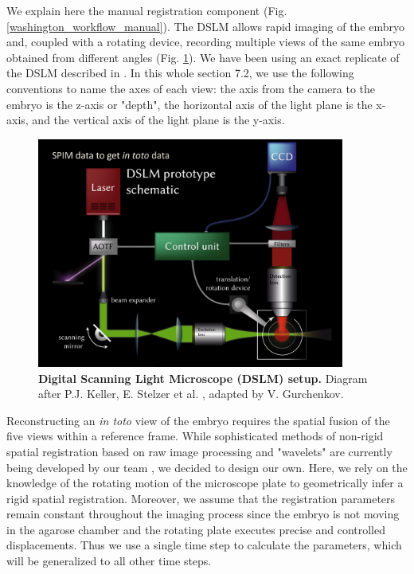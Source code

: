    We explain here the manual registration component (Fig. \ref{washington_workflow_manual}). The DSLM allows rapid imaging of the embryo and, coupled with a rotating device, recording multiple views of the same embryo obtained from different angles (Fig. \ref{washington_SPIM}). We have been using an exact replicate of the DSLM described in \cite{Keller:2008km}. In this whole section 7.2, we use the following conventions to name the axes of each view: the axis from the camera to the embryo is the z-axis or "depth", the horizontal axis of the light plane is the x-axis, and the vertical axis of the light plane is the y-axis.  
\begin{figure}
\begin{center}
\includegraphics[width=0.9\textwidth]{../../images/Reconstruction/washington/SPIM_corrected.png}
\end{center}
\caption{\textbf{Digital Scanning Light Microscope (DSLM) setup.} Diagram after P.J. Keller, E. Stelzer et al. \cite{Keller:2008km}, adapted by V. Gurchenkov.}
\label{washington_SPIM}
\end{figure}

   Reconstructing an \textit{in toto} view of the embryo requires the spatial fusion of the five views within a reference frame. While sophisticated methods of non-rigid spatial registration based on raw image processing and "wavelets" are currently being developed by our team \cite{RubioGuivernau:2012dx}, we decided to design our own. Here, we rely on the knowledge of the rotating motion of the microscope plate to geometrically infer a rigid spatial registration. Moreover, we assume that the registration parameters remain constant throughout the imaging process since the embryo is not moving in the agarose chamber and the rotating plate executes precise and controlled displacements. Thus we use a single time step to calculate the parameters, which will be generalized to all other time steps.  

